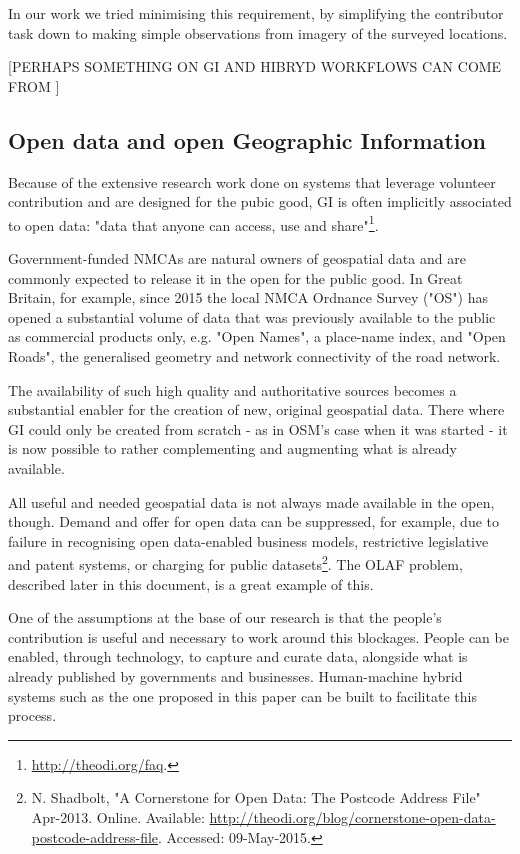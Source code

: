 In our work we tried minimising this requirement, by simplifying the contributor task down to making simple observations from imagery of the surveyed locations.

[PERHAPS SOMETHING ON GI AND HIBRYD WORKFLOWS CAN COME FROM \cite{Rice:2012vy} ]

\subsection{Open data and open Geographic Information}
\label{open-data-and-gi}

Because of the extensive research work done on systems that leverage volunteer contribution and are designed for the pubic good, GI is often implicitly associated to open data: "data that anyone can access, use and share"\footnote{\url{http://theodi.org/faq}.}. 

Government-funded NMCAs are natural owners of geospatial data and are commonly expected to release it in the open for the public good. In Great Britain, for example, since 2015 the local NMCA Ordnance Survey ("OS") has opened a substantial volume of data that was previously available to the public as commercial products only, e.g. "Open Names", a place-name index, and "Open Roads", the generalised geometry and network connectivity of the road network.
	
The availability of such high quality and authoritative sources becomes a substantial enabler for the creation of new, original geospatial data. There where GI could only be created from scratch - as in OSM's case when it was started - it is now possible to rather complementing and augmenting what is already available.

All useful and needed geospatial data is not always made available in the open, though. Demand and offer for open data can be suppressed, for example, due to failure in recognising open data-enabled business models, restrictive legislative and patent systems, or charging for public datasets\footnote{N. Shadbolt, "A Cornerstone for Open Data: The Postcode Address File" Apr-2013. Online. Available: \url{http://theodi.org/blog/cornerstone-open-data-postcode-address-file}. Accessed: 09-May-2015.}. The OLAF problem, described later in this document, is a great example of this.
	
One of the assumptions at the base of our research is that the people's contribution is useful and necessary to work around this blockages. People can be enabled, through technology, to capture and curate data, alongside what is already published by governments and businesses. Human-machine hybrid systems such as the one proposed in this paper can be built to facilitate this process.

